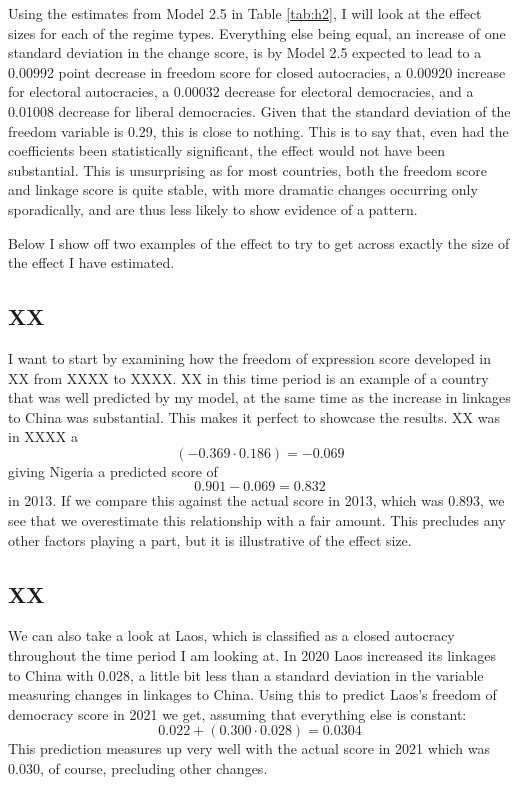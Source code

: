 Using the estimates from Model 2.5 in Table \ref{tab:h2}, I will look at the effect sizes for each of the regime types. Everything else being equal, an increase of one standard deviation in the change score, is by Model 2.5 expected to lead to a 0.00992 point decrease in freedom score for closed autocracies, a 0.00920 increase for electoral autocracies, a 0.00032 decrease for electoral democracies, and a 0.01008 decrease for liberal democracies. Given that the standard deviation of the freedom variable is 0.29, this is close to nothing. This is to say that, even had the coefficients been statistically significant, the effect would not have been substantial. This is unsurprising as for most countries, both the freedom score and linkage score is quite stable, with more dramatic changes occurring only sporadically, and are thus less likely to show evidence of a pattern.

Below I show off two examples of the effect to try to get across exactly the size of the effect I have estimated. 

\subsection{XX}
I want to start by examining how the freedom of expression score developed in XX from XXXX to XXXX. XX in this time period is an example of a country that was well predicted by my model, at the same time as the increase in linkages to China was substantial. This makes it perfect to showcase the results. XX was in XXXX a  
\begin{equation} \label{gabon_decrease}
    (-0.369 \cdot 0.186)  = -0.069
\end{equation}
giving Nigeria a predicted score of
\begin{equation} \label{nigeria_score}
    0.901 - 0.069 = 0.832
\end{equation}
in 2013. If we compare this against the actual score in 2013, which was 0.893, we see that we overestimate this relationship with a fair amount. This precludes any other factors playing a part, but it is illustrative of the effect size.

\subsection{XX}
We can also take a look at Laos, which is classified as a closed autocracy throughout the time period I am looking at. In 2020 Laos increased its linkages to China with 0.028, a little bit less than a standard deviation in the variable measuring changes in linkages to China. Using this to predict Laos's freedom of democracy score in 2021 we get, assuming that everything else is constant:
\begin{equation}
    0.022 + (0.300 \cdot 0.028) = 0.0304
\end{equation}
This prediction measures up very well with the actual score in 2021 which was 0.030, of course, precluding other changes.

